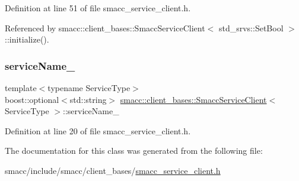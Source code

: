 Definition at line 51 of file smacc\+\_\+service\+\_\+client.\+h.



Referenced by smacc\+::client\+\_\+bases\+::\+Smacc\+Service\+Client$<$ std\+\_\+srvs\+::\+Set\+Bool $>$\+::initialize().

\mbox{\label{classsmacc_1_1client__bases_1_1SmaccServiceClient_a63732ec406cb8b6f65bbdbb73e01c7ab}} 
\subsubsection{\texorpdfstring{service\+Name\+\_\+}{serviceName\_}}
{\footnotesize\ttfamily template$<$typename Service\+Type$>$ \\
boost\+::optional$<$std\+::string$>$ \hyperlink{classsmacc_1_1client__bases_1_1SmaccServiceClient}{smacc\+::client\+\_\+bases\+::\+Smacc\+Service\+Client}$<$ Service\+Type $>$\+::service\+Name\+\_\+}



Definition at line 20 of file smacc\+\_\+service\+\_\+client.\+h.



The documentation for this class was generated from the following file\+:\begin{DoxyCompactItemize}
\item 
smacc/include/smacc/client\+\_\+bases/\hyperlink{smacc__service__client_8h}{smacc\+\_\+service\+\_\+client.\+h}\end{DoxyCompactItemize}
